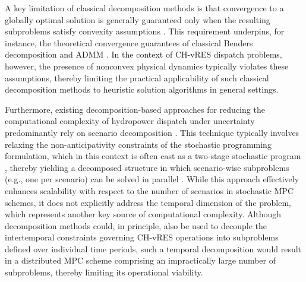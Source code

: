 \documentclass[a4paper,fleqn]{cas-sc}
\begin{document}
A key limitation of classical decomposition methods is that convergence to a globally optimal solution is generally guaranteed only when the resulting subproblems satisfy convexity assumptions \citep{molzahn2017survey}.
This requirement underpins, for instance, the theoretical convergence guarantees of classical Benders decomposition \citep{rahmaniani2017benders} and ADMM \citep{boyd2010distributed}.
In the context of CH-vRES dispatch problems, however, the presence of nonconvex physical dynamics typically violates these assumptions, thereby limiting the practical applicability of such classical decomposition methods to heuristic solution algorithms in general settings.

Furthermore, existing decomposition-based approaches for reducing the computational complexity of hydropower dispatch under uncertainty predominantly rely on scenario decomposition \citep{moiseeva2017strategic}.
This technique typically involves relaxing the non-anticipativity constraints of the stochastic programming formulation, which in this context is often cast as a two-stage stochastic program \citep{rodriguez2021accelerating}, thereby yielding a decomposed structure in which scenario-wise subproblems (e.g., one per scenario) can be solved in parallel \citep{ge2019multiple}.
While this approach effectively enhances scalability with respect to the number of scenarios in stochastic MPC schemes, it does not explicitly address the temporal dimension of the problem, which represents another key source of computational complexity.
Although decomposition methods could, in principle, also be used to decouple the intertemporal constraints governing CH-vRES operations into subproblems defined over individual time periods, 
such a temporal decomposition would result in a distributed MPC scheme comprising an impractically large number of subproblems, thereby limiting its operational viability.
\end{document}
